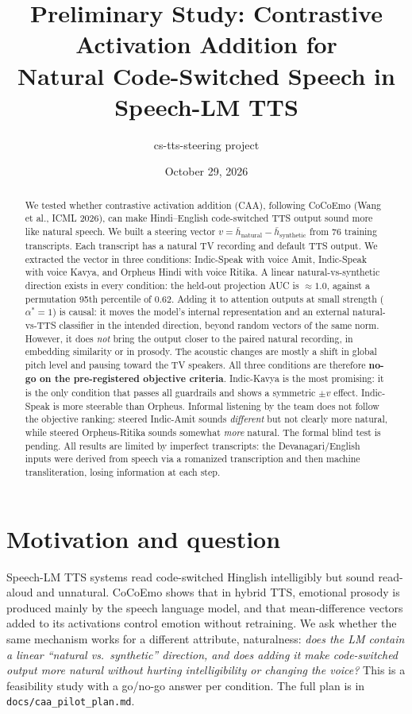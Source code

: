 \documentclass[11pt]{article}
\title{Preliminary Study: Contrastive Activation Addition for\\Natural Code-Switched Speech in Speech-LM TTS}
\author{cs-tts-steering project}
\date{October 29, 2026}
\newcommand{\astar}{\alpha^{*}}
\begin{document}
\maketitle

\begin{abstract}
We tested whether contrastive activation addition (CAA), following CoCoEmo (Wang et al., ICML 2026), can make Hindi--English code-switched TTS output sound more like natural speech. We built a steering vector $v=\bar h_{\text{natural}}-\bar h_{\text{synthetic}}$ from 76 training transcripts. Each transcript has a natural TV recording and default TTS output. We extracted the vector in three conditions: Indic-Speak with voice Amit, Indic-Speak with voice Kavya, and Orpheus Hindi with voice Ritika. A linear natural-vs-synthetic direction exists in every condition: the held-out projection AUC is $\approx1.0$, against a permutation 95th percentile of $0.62$. Adding it to attention outputs at small strength ($\astar=1$) is causal: it moves the model's internal representation and an external natural-vs-TTS classifier in the intended direction, beyond random vectors of the same norm. However, it does \emph{not} bring the output closer to the paired natural recording, in embedding similarity or in prosody. The acoustic changes are mostly a shift in global pitch level and pausing toward the TV speakers. All three conditions are therefore \textbf{no-go on the pre-registered objective criteria}. Indic-Kavya is the most promising: it is the only condition that passes all guardrails and shows a symmetric $\pm v$ effect. Indic-Speak is more steerable than Orpheus. Informal listening by the team does not follow the objective ranking: steered Indic-Amit sounds \emph{different} but not clearly more natural, while steered Orpheus-Ritika sounds somewhat \emph{more} natural. The formal blind test is pending. All results are limited by imperfect transcripts: the Devanagari/English inputs were derived from speech via a romanized transcription and then machine transliteration, losing information at each step.
\end{abstract}

\section{Motivation and question}
Speech-LM TTS systems read code-switched Hinglish intelligibly but sound read-aloud and unnatural. CoCoEmo shows that in hybrid TTS, emotional prosody is produced mainly by the speech language model, and that mean-difference vectors added to its activations control emotion without retraining. We ask whether the same mechanism works for a different attribute, naturalness: \emph{does the LM contain a linear ``natural vs.\ synthetic'' direction, and does adding it make code-switched output more natural without hurting intelligibility or changing the voice?} This is a feasibility study with a go/no-go answer per condition. The full plan is in \texttt{docs/caa\_pilot\_plan.md}.
\end{document}
